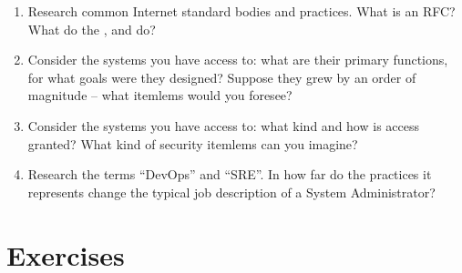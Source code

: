 \begin{enumerate}
\item Research common Internet standard bodies and
practices.  What is an RFC?  What do the
,  and
 do?

\item Consider the systems you have access to: what
are their primary functions, for what goals were they
designed?  Suppose they grew by an order of magnitude
-- what itemlems would you foresee?

\item Consider the systems you have access to: what
kind and how is access granted?  What kind of security
itemlems can you imagine?

\item Research the terms ``DevOps'' and
``SRE''.  In how far do the practices it
represents change the typical job description of a
System Administrator?

\end{enumerate}

\section*{Exercises}

